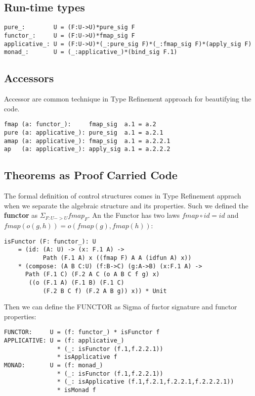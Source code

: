 \documentclass{article}
\begin{document}
\subsection{Run-time types}

\begin{lstlisting}[mathescape=true]
pure_:        U = (F:U->U)*pure_sig F
functor_:     U = (F:U->U)*fmap_sig F
applicative_: U = (F:U->U)*(_:pure_sig F)*(_:fmap_sig F)*(apply_sig F)
monad_:       U = (_:applicative_)*(bind_sig F.1)
\end{lstlisting}

\subsection{Accessors}

Accessor are common technique in Type Refinement approach for beautifying the code.

\begin{lstlisting}[mathescape=true]
fmap (a: functor_):     fmap_sig  a.1 = a.2
pure (a: applicative_): pure_sig  a.1 = a.2.1
amap (a: applicative_): fmap_sig  a.1 = a.2.2.1
ap   (a: applicative_): apply_sig a.1 = a.2.2.2
\end{lstlisting}

\subsection{Theorems as Proof Carried Code}

The formal definition of control structures comes in Type Refinement apprach when
we separate the algebraic structure and its properties. Such we defined the {\bf functor}
as $\Sigma_{F:U->U} fmap_F$. An the Functor has two laws $fmap \circ id = id$ and
$ fmap(o(g,h)) = o(fmap(g),fmap(h))$:

\begin{lstlisting}[mathescape=true]
isFunctor (F: functor_): U
    = (id: (A: U) -> (x: F.1 A) ->
           Path (F.1 A) x ((fmap F) A A (idfun A) x))
    * (compose: (A B C:U) (f:B->C) (g:A->B) (x:F.1 A) ->
      Path (F.1 C) (F.2 A C (o A B C f g) x)
       ((o (F.1 A) (F.1 B) (F.1 C)
           (F.2 B C f) (F.2 A B g)) x)) * Unit
\end{lstlisting}

Then we can define the FUNCTOR as Sigma of fuctor signature and functor properties:

\begin{lstlisting}[mathescape=true]
FUNCTOR:     U = (f: functor_) * isFunctor f
APPLICATIVE: U = (f: applicative_)
               * (_: isFunctor (f.1,f.2.2.1))
               * isApplicative f
MONAD:       U = (f: monad_)
               * (_: isFunctor (f.1,f.2.2.1))
               * (_: isApplicative (f.1,f.2.1,f.2.2.1,f.2.2.2.1))
               * isMonad f
\end{lstlisting}
\end{document}
